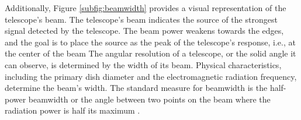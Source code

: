 Additionally, Figure \ref{subfig:beamwidth} provides a visual representation of the telescope's beam.
The telescope's beam indicates the source of the strongest signal detected by the telescope.
The beam power weakens towards the edges, and the goal is to place the source as the peak of the telescope's response, i.e., at the center of the beam
The angular resolution of a telescope, or the solid angle it can observe, is determined by the width of its beam.
Physical characteristics, including the primary dish diameter and the electromagnetic radiation frequency, determine the beam's width.
The standard measure for beamwidth is the half-power beamwidth or the angle between two points on the beam where the radiation power is half its maximum \cite{ToolsOfAst2009}.



